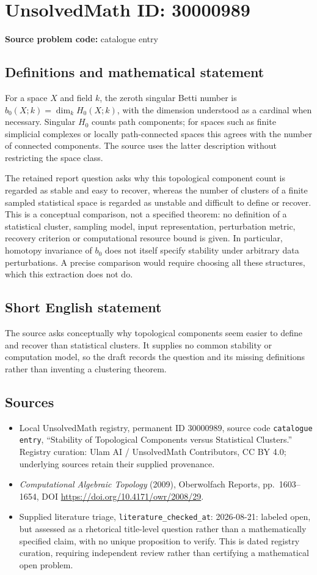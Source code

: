 \documentclass[11pt]{article}
\begin{document}
\section*{UnsolvedMath ID: 30000989}
\textbf{Source problem code:} catalogue entry
\subsection{Definitions and mathematical statement}
For a space \(X\) and field \(k\), the zeroth singular Betti number is \(b_0(X;k)=\dim_k H_0(X;k)\), with the dimension understood as a cardinal when necessary. Singular \(H_0\) counts path components; for spaces such as finite simplicial complexes or locally path-connected spaces this agrees with the number of connected components. The source uses the latter description without restricting the space class.

The retained report question asks why this topological component count is regarded as stable and easy to recover, whereas the number of clusters of a finite sampled statistical space is regarded as unstable and difficult to define or recover. This is a conceptual comparison, not a specified theorem: no definition of a statistical cluster, sampling model, input representation, perturbation metric, recovery criterion or computational resource bound is given. In particular, homotopy invariance of \(b_0\) does not itself specify stability under arbitrary data perturbations. A precise comparison would require choosing all these structures, which this extraction does not do.
\subsection{Short English statement}
The source asks conceptually why topological components seem easier to define and recover than statistical clusters. It supplies no common stability or computation model, so the draft records the question and its missing definitions rather than inventing a clustering theorem.
\subsection{Sources}
\begin{itemize}
\item Local UnsolvedMath registry, permanent ID \(30000989\), source code \texttt{catalogue entry}, ``Stability of Topological Components versus Statistical Clusters.'' Registry curation: Ulam AI / UnsolvedMath Contributors, CC BY 4.0; underlying sources retain their supplied provenance.
\item \emph{Computational Algebraic Topology} (2009), Oberwolfach Reports, pp.\ 1603--1654, DOI \url{https://doi.org/10.4171/owr/2008/29}.
\item Supplied literature triage, \texttt{literature\_checked\_at}: 2026-08-21: labeled open, but assessed as a rhetorical title-level question rather than a mathematically specified claim, with no unique proposition to verify. This is dated registry curation, requiring independent review rather than certifying a mathematical open problem.
\end{itemize}
\end{document}
